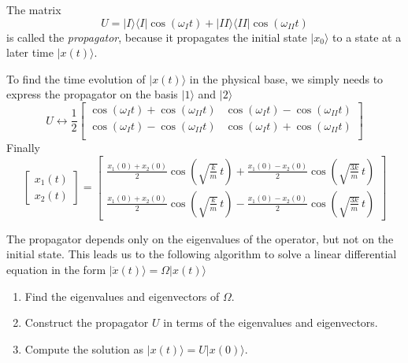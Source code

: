 \documentclass[11pt,fleqn]{book} %
\newcommand{\bra}[1]{\langle #1|}
\newcommand{\ket}[1]{| #1\rangle}
\begin{document}
\begin{definition}[Propagator]
    The matrix
    \begin{equation*}
        U = \ket{I}\bra{I}\cos(\omega_I t) + \ket{II}\bra{II}\cos(\omega_{II} t)
    \end{equation*}
    is called the \textit{propagator}, because it propagates the initial state $\ket{x_0}$ to a state at a later time $\ket{x(t)}$.
\end{definition}
To find the time evolution of $\ket{x(t)}$ in the physical base, we simply needs to express the propagator on the basis $\ket{1}$ and $\ket{2}$
\begin{equation*}
    U \leftrightarrow \frac{1}{2}\left[
        \begin{array}{cc}
            \cos(\omega_I t)+\cos(\omega_{II} t) & \cos(\omega_I t)-\cos(\omega_{II} t) \\
            \cos(\omega_I t)-\cos(\omega_{II} t) & \cos(\omega_I t)+\cos(\omega_{II} t) \\
        \end{array}
    \right]
\end{equation*}
Finally
\begin{equation*}
    \left[\begin{array}{c}
        x_1(t) \\
        x_2(t)
    \end{array}\right] = 
    \left[\begin{array}{c}
        \frac{x_1(0)+x_2(0)}{2}\cos\left(\sqrt{\frac{k}{m}}\,t\right) + \frac{x_1(0)-x_2(0)}{2}\cos\left(\sqrt{\frac{3k}{m}}\,t\right) \\
        \frac{x_1(0)+x_2(0)}{2}\cos\left(\sqrt{\frac{k}{m}}\,t\right) - \frac{x_1(0)-x_2(0)}{2}\cos\left(\sqrt{\frac{3k}{m}}\,t\right)
    \end{array}\right]
\end{equation*}

The propagator depends only on the eigenvalues of the operator, but not on the initial state. This leads us to the following algorithm to 
solve a linear differential equation in the form $\ket{\ddot{x}(t)} = \Omega\ket{x(t)}$
\begin{enumerate}
    \item Find the eigenvalues and eigenvectors of $\Omega$.
    \item Construct the propagator $U$ in terms of the eigenvalues and eigenvectors.
    \item Compute the solution as $\ket{x(t)} = U\ket{x(0)}$.
\end{enumerate}
\end{document}

